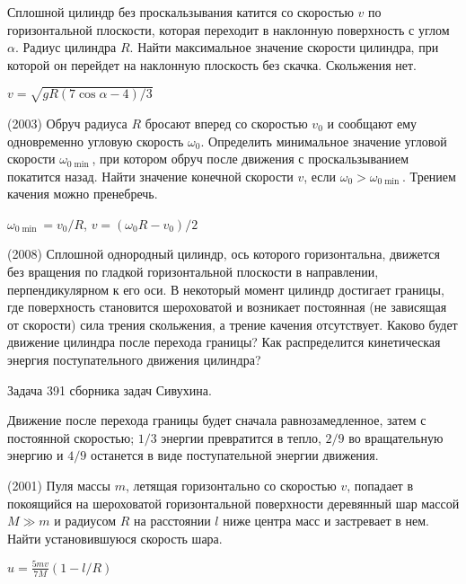 \begin{ex}
Сплошной цилиндр без проскальзывания катится со скоростью $v$ по горизонтальной плоскости, которая переходит в наклонную поверхность с углом $\alpha$. Радиус цилиндра $R$. Найти максимальное значение скорости цилиндра, при которой он перейдет на наклонную плоскость без скачка. Скольжения нет.
\begin{ans}
$v=\sqrt{gR(7\cos \alpha - 4)/3}$
\end{ans}
\end{ex}

\begin{ex}
(2003) Обруч радиуса $R$ бросают вперед со скоростью $v_0$ и сообщают ему одновременно угловую скорость $\omega_0$. 
Определить минимальное значение угловой скорости  $\omega_{0 \min}$, при котором обруч после движения с проскальзыванием покатится назад. 
Найти значение конечной скорости $v$, если $\omega_0 > \omega_{0 \min} $. Трением качения можно пренебречь.
\begin{ans}
$\omega_{0 \min} = v_0/R$, $v= (\omega_0R - v_0)/2$
\end{ans}
\end{ex}

\begin{ex}
(2008) Сплошной однородный цилиндр, ось которого горизонтальна, движется без вращения по гладкой горизонтальной плоскости в направлении, перпендикулярном к его оси. В некоторый момент цилиндр достигает границы, где поверхность становится шероховатой и возникает постоянная (не зависящая от скорости) сила трения скольжения, а трение качения отсутствует. Каково будет движение цилиндра после перехода границы? Как распределится кинетическая энергия поступательного движения цилиндра?
\begin{sol}
Задача 391 сборника задач Сивухина.
\end{sol}
\begin{ans}
Движение после перехода границы будет сначала равнозамедленное, затем с постоянной скоростью; $1/3$ энергии превратится в тепло, $2/9$ во вращательную энергию и $4/9$ останется в виде поступательной энергии движения.
\end{ans}
\end{ex}

\begin{ex}
(2001) Пуля массы $m$, летящая горизонтально со скоростью $v$, попадает в покоящийся на шероховатой горизонтальной поверхности деревянный шар массой $M \gg m$  и радиусом $R$ на расстоянии $l$ ниже центра масс и застревает в нем. Найти установившуюся скорость шара.
\begin{ans}
$u = \frac{5mv}{7M}\left( 1 - l/R \right)$
\end{ans}
\end{ex}


